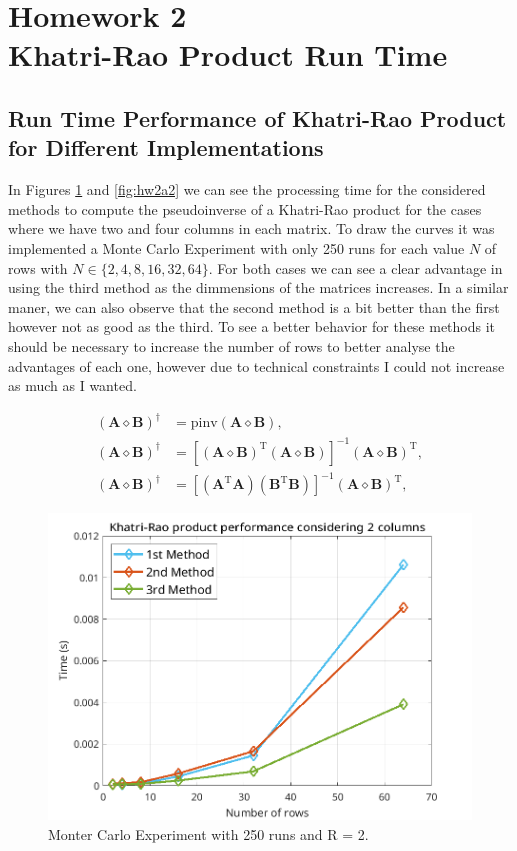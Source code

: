 \documentclass[a4paper,10pt]{article}
\begin{document}
\newpage
\section*{Homework 2 \\ Khatri-Rao Product Run Time}

    \subsection*{Run Time Performance of Khatri-Rao Product for Different Implementations}

    In Figures \ref{fig:hw2a1} and \ref{fig:hw2a2} we can see the processing time for the considered methods to compute the pseudoinverse of a Khatri-Rao product for the cases
    where we have two and four columns in each matrix. To draw the curves it was implemented a Monte Carlo Experiment with only 250 runs for each value $N$ of rows with $N \in \{2, 4, 8, 16, 32, 64\}$.
    For both cases we can see a clear advantage in using the third method as the dimmensions of the matrices increases. In a similar maner, we can also observe that the second method is a bit better than the first however 
    not as good as the third. To see a better behavior for these methods it should be necessary to increase the number of rows to better analyse the advantages of each one, however due to technical constraints 
    I could not increase as much as I wanted. 

    \begin{align}
        (\boldsymbol{A} \diamond \boldsymbol{B})^{\dagger} &= \text{pinv}(\boldsymbol{A} \diamond \boldsymbol{B}), \\
        (\boldsymbol{A} \diamond \boldsymbol{B})^{\dagger} &= [(\boldsymbol{A} \diamond \boldsymbol{B})^{\text{T}} (\boldsymbol{A} \diamond \boldsymbol{B})]^{-1} (\boldsymbol{A} \diamond \boldsymbol{B})^{\text{T}}, \\
        (\boldsymbol{A} \diamond \boldsymbol{B})^{\dagger} &= [(\boldsymbol{A}^{\text{T}}\boldsymbol{A})(\boldsymbol{B}^{\text{T}}\boldsymbol{B})]^{-1} (\boldsymbol{A} \diamond \boldsymbol{B})^{\text{T}}, 
    \end{align}

    \begin{figure}[ht!]
        \centering 
        \includegraphics[width=0.75\linewidth]{figs/hw2a1.png} \par 
        \caption{Monter Carlo Experiment with 250 runs and R = 2.}
        \label{fig:hw2a1} 
    \end{figure}
\end{document}
